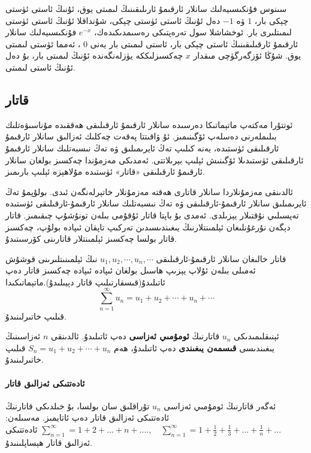 سىنوس فۇنكىسىيەلىك سانلار ئارقىمۇ ئارىلىقىنىڭ لىمىتى يوق، ئۇنىڭ ئاستى ئۈستى چېكى بار، $1$ ۋە $-1$ دەل ئۇنىڭ ئاستى ئۈستى چېكى، شۇنداقلا ئۇنىڭ ئاستى ئۈستى لىمىتلىرى بار. ئوخشاشلا سول تەرەپتىكى رەسىمدىكىدەك، $e^{-x}$ فۇنكىسىيەلىك سانلار ئارقىمۇ ئارقىلىقىنىڭ ئاستى چېكى بار، ئاستى لىمىتى بار يەنى $0$ ، ئەمما ئۈستى لىمىتى يوق. شۇڭا ئۆزگەرگۈچى مىقدار $x$ چەكسىزلىككە يۈزلەنگەندە ئۇنىڭ لىمىتى بار، بۇ دەل ئۇنىڭ ئاستى لىمىتى.

\subsection{قاتار}
ئوتتۇرا مەكتەپ ماتېماتىكا دەرسىدە سانلار ئارقىمۇ ئارقىلىقى ھەققىدە مۇناسىۋەتلىك بىلىملەرنى دەسلەپ ئۆگىنىمىز. ئۇ ۋاقىتتا پەقەت چەكلىك ئەزالىق سانلار ئارقىمۇ ئارقىلىقى ئۈستىدە، يەنە كىلىپ تەڭ ئايرىمىلىق ۋە تەڭ نىسبەتلىك سانلار ئارقىمۇ ئارقىلىقى ئۈستىدىلا ئۆگىنىش ئېلىپ بېرىلاتتى. ئەمدىكى مەزمۇندا چەكسىز بولغان سانلار ئارقىمۇ ئارقىلىقى «قاتار» ئۈستىدە مۇلاھېزە ئېلىپ بارىمىز.
\par
ئالدىنقى مەزمۇنلاردا سانلار قاتارى ھەقتە مەزمۇنلار خاتېرلەنگەن ئىدى. بولۇپمۇ تەڭ ئايرىمىلىق   سانلار ئارقىمۇ-ئارقىلىقى ۋە تەڭ نىسبەتلىك سانلار ئارقىمۇ-ئارقىلىقى ئۈستىدە تەپسىلىي نۇقتىلار يېزىلدى. ئەمدى بۇ باپتا قاتار ئۇقۇمى بىلەن تونۇشۇپ چىقىمىز. قاتار دېگەن نۇرغۇنلىغان ئېلمىنتلارنىڭ يىغىندىسىدىن تەركىپ تاپقان ئىپادە بولۇپ، چەكسىز قاتار بولسا چەكسىز ئېلمىنتلار قاتارىنى كۆرسىتىدۇ.

\begin{MyDefinition}{قاتار}{}
خالىغان سانلار ئارقىمۇ-ئارقىلىقى $u_1,u_2,\cdots,u_n,\cdots$ نىڭ ئېلمىنىتلىرىنى قوشۇش ئەمىلى بىلەن ئۇلاپ يېزىپ ھاسىل بولغان ئىپادە ئىپادە چەكسىز قاتار دەپ ئاتىلىدۇ(قىسقارتىلىپ قاتار دېيىلىدۇ).ماتېماتىكىدا 
$$\sum\limits_{n=1}^\infty u_n=u_1+u_2+\cdots+u_n+\cdots$$
 قىلىپ خاتىرلىنىدۇ.
\end{MyDefinition}

	ئېنىقلىمىدىكى $u_n$ قاتارنىڭ \textbf{ئومۇمىي ئەزاسى} دەپ ئاتىلىدۇ. ئالدىنقى $n$ ئەزاسىنىڭ يىغىندىسى \textbf{قىسمەن يىغىندى} دەپ ئاتىلىدۇ، ھەم $S_n=u_1+u_2+\cdots+u_n$ قىلىپ خاتىرلىنىدۇ.

\paragraph{ئادەتتىكى ئەزالىق قاتار}
ئەگەر قاتارنىڭ ئومۇمىي ئەزاسى $u_n$ تۇراقلىق سان بولسا، بۇ خىلدىكى قاتارنىڭ ئادەتتىكى ئەزالىق قاتار دەپ ئاتايمىز. مەسىلەن: 
$
\sum_{n=1}^{\infty} = 1+2+...+n+.... ,\quad \sum_{n=1}^{\infty} = 1+\frac{1}{2}+\frac{1}{3}+...+\frac{1}{n}+...
$
ئادەتتىكى ئەزالىق قاتار ھېساپلىنىدۇ.

